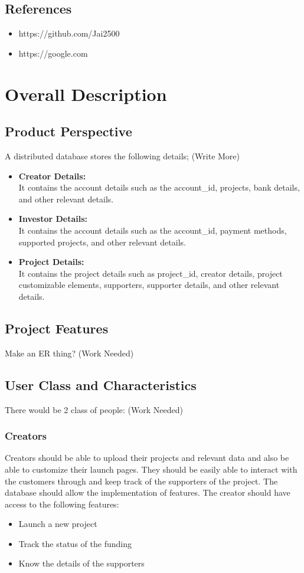 \documentclass{report}[12pt]
\begin{document}
\section{References}
\begin{itemize}
    \item https://github.com/Jai2500
    \item https://google.com
\end{itemize}

\chapter{Overall Description}
\section{Product Perspective}
A distributed database stores the following details; (Write More)
\begin{itemize}
    \item \textbf{Creator Details: }\\
    It contains the account details such as the account\_id, projects, bank details, and other relevant details.
    \item \textbf{Investor Details: }\\
    It contains the account details such as the account\_id, payment methods, supported projects, and other relevant details.
    \item \textbf{Project Details: }\\
    It contains the project details such as project\_id, creator details, project customizable elements, supporters, supporter details, and other relevant details. 
\end{itemize}
\section{Project Features}
Make an ER thing? (Work Needed)

\section{User Class and Characteristics}
There would be 2 class of people:  (Work Needed)
\subsection{Creators}
Creators should be able to upload their projects and relevant data and also be able to customize their launch pages. They should be easily able to interact with the customers through and keep track of the supporters of the project. The database should allow the implementation of features. The creator should have access to the following features: 
\begin{itemize}
    \item Launch a new project
    \item Track the status of the funding
    \item Know the details of the supporters
\end{itemize}
\end{document}
